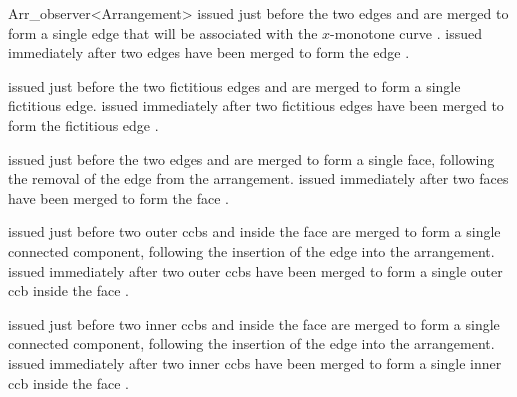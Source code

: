 \begin{ccRefClass}{Arr_observer<Arrangement>}
    {issued just before the two edges  and  are merged to
     form a single edge that will be associated with the $x$-monotone curve
     .}
\ccGlue
{}
    {issued immediately after two edges have been merged to form the edge
     .}

    {issued just before the two fictitious edges  and  are
     merged to form a single fictitious edge.}
\ccGlue
{}
    {issued immediately after two fictitious edges have been merged to form
     the fictitious edge .}

    {issued just before the two edges  and  are merged to
     form a single face, following the removal of the edge  from the
     arrangement.}
\ccGlue
{}
    {issued immediately after two faces have been merged to form the face
     .}

    {issued just before two outer ccbs  and  inside the face 
      are merged to form a single connected component, following the
     insertion of the edge  into the arrangement.}
\ccGlue
{}
    {issued immediately after two outer ccbs have been merged to form a single
     outer ccb  inside the face .}

    {issued just before two inner ccbs  and  inside the face 
      are merged to form a single connected component, following the
     insertion of the edge  into the arrangement.}
\ccGlue
{}
    {issued immediately after two inner ccbs have been merged to form a single
     inner ccb  inside the face .}


\end{ccRefClass}
